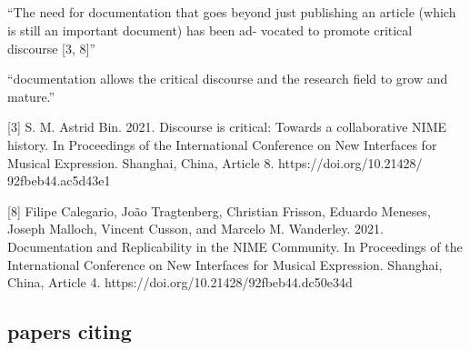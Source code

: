 




\subsection{\cite{fiordelmondo_towards_2025}}
``The need for documentation that goes beyond just publishing an article (which is still an important document) has been ad- vocated to promote critical discourse [3, 8]''

``documentation allows the critical discourse and the research field to grow and mature.''

[3] S. M. Astrid Bin. 2021. Discourse is critical: Towards a collaborative NIME
history. In Proceedings of the International Conference on New Interfaces for Musical Expression. Shanghai, China, Article 8. https://doi.org/10.21428/ 92fbeb44.ac5d43e1

    [8] Filipe Calegario, João Tragtenberg, Christian Frisson, Eduardo Meneses, Joseph
Malloch, Vincent Cusson, and Marcelo M. Wanderley. 2021. Documentation and Replicability in the NIME Community. In Proceedings of the International Conference on New Interfaces for Musical Expression. Shanghai, China, Article 4. https://doi.org/10.21428/92fbeb44.dc50e34d

\subsection{papers citing \cite{mcpherson_nimehub_2016}}


